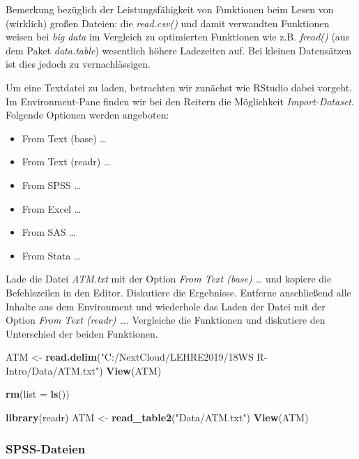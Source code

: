 \documentclass[]{article}
\newenvironment{Shaded}{\begin{snugshade}}{\end{snugshade}}
\newcommand{\KeywordTok}[1]{\textcolor[rgb]{0.13,0.29,0.53}{\textbf{#1}}}
\newcommand{\DataTypeTok}[1]{\textcolor[rgb]{0.13,0.29,0.53}{#1}}
\newcommand{\StringTok}[1]{\textcolor[rgb]{0.31,0.60,0.02}{#1}}
\newcommand{\NormalTok}[1]{#1}
\providecommand{\tightlist}{%
  \setlength{\itemsep}{0pt}\setlength{\parskip}{0pt}}
\begin{document}
Bemerkung bezüglich der Leistungsfähigkeit von Funktionen beim Lesen von
(wirklich) großen Dateien: die \emph{read.csv()} und damit verwandten
Funktionen weisen bei \emph{big data} im Vergleich zu optimierten
Funktionen wie z.B. \emph{fread()} (aus dem Paket \emph{data.table})
wesentlich höhere Ladezeiten auf. Bei kleinen Datensätzen ist dies
jedoch zu vernachlässigen.

Um eine Textdatei zu laden, betrachten wir zunächst wie RStudio dabei
vorgeht. Im Environment-Pane finden wir bei den Reitern die Möglichkeit
\emph{Import-Dataset}. Folgende Optionen werden angeboten:

\begin{itemize}
\tightlist
\item
  From Text (base) \ldots{}
\item
  From Text (readr) \ldots{}
\item
  From SPSS \ldots{}
\item
  From Excel \ldots{}
\item
  From SAS \ldots{}
\item
  From Stata \ldots{}
\end{itemize}

Lade die Datei \emph{ATM.txt} mit der Option \emph{From Text (base)
\ldots{}} und kopiere die Befehlszeilen in den Editor. Diskutiere die
Ergebnisse. Entferne anschließend alle Inhalte aus dem Environment und
wiederhole das Laden der Datei mit der Option \emph{From Text (readr)
\ldots{}}. Vergleiche die Funktionen und diskutiere den Unterschied der
beiden Funktionen.

\begin{Shaded}
\begin{Highlighting}[]
\NormalTok{  ATM <-}\StringTok{ }\KeywordTok{read.delim}\NormalTok{(}\StringTok{"C:/NextCloud/LEHRE2019/18WS R-Intro/Data/ATM.txt"}\NormalTok{)}
  \KeywordTok{View}\NormalTok{(ATM)  }
  
  \KeywordTok{rm}\NormalTok{(}\DataTypeTok{list =} \KeywordTok{ls}\NormalTok{())}
  
  \KeywordTok{library}\NormalTok{(readr)}
\NormalTok{  ATM <-}\StringTok{ }\KeywordTok{read_table2}\NormalTok{(}\StringTok{"Data/ATM.txt"}\NormalTok{)}
  \KeywordTok{View}\NormalTok{(ATM)}
\end{Highlighting}
\end{Shaded}

\subsubsection*{SPSS-Dateien}\label{spss-dateien}
\end{document}
